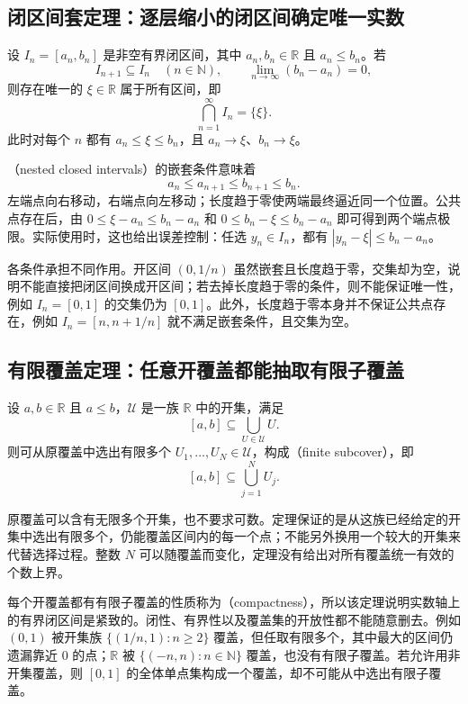 \documentclass[UTF8,12pt,a4paper,fontset=fandol,oneside]{ctexart}
\begin{document}
\subsection{闭区间套定理：逐层缩小的闭区间确定唯一实数}

\begin{theorem}[闭区间套定理]
  \label{thm:nested-intervals}
  设 $I_n=[a_n,b_n]$ 是非空有界闭区间，其中 $a_n,b_n\in\mathbb R$ 且 $a_n\leq b_n$。若
  \[
    I_{n+1}\subseteq I_n\quad(n\in\mathbb N),
    \qquad \lim_{n\to\infty}(b_n-a_n)=0,
  \]
  则存在唯一的 $\xi\in\mathbb R$ 属于所有区间，即
  \[
    \bigcap_{n=1}^{\infty}I_n=\{\xi\}.
  \]
  此时对每个 $n$ 都有 $a_n\leq\xi\leq b_n$，且 $a_n\to\xi$、$b_n\to\xi$。
\end{theorem}

（nested closed intervals）的嵌套条件意味着
\[
  a_n\leq a_{n+1}\leq b_{n+1}\leq b_n.
\]
左端点向右移动，右端点向左移动；长度趋于零使两端最终逼近同一个位置。公共点存在后，由 $0\leq\xi-a_n\leq b_n-a_n$ 和 $0\leq b_n-\xi\leq b_n-a_n$ 即可得到两个端点极限。实际使用时，这也给出误差控制：任选 $y_n\in I_n$，都有 $|y_n-\xi|\leq b_n-a_n$。

各条件承担不同作用。开区间 $(0,1/n)$ 虽然嵌套且长度趋于零，交集却为空，说明不能直接把闭区间换成开区间；若去掉长度趋于零的条件，则不能保证唯一性，例如 $I_n=[0,1]$ 的交集仍为 $[0,1]$。此外，长度趋于零本身并不保证公共点存在，例如 $I_n=[n,n+1/n]$ 就不满足嵌套条件，且交集为空。

\subsection{有限覆盖定理：任意开覆盖都能抽取有限子覆盖}

\begin{theorem}[有限覆盖定理]
  \label{thm:finite-cover}
  设 $a,b\in\mathbb R$ 且 $a\leq b$，$\mathcal U$ 是一族 $\mathbb R$ 中的开集，满足
  \[
    [a,b]\subseteq\bigcup_{U\in\mathcal U}U.
  \]
  则可从原覆盖中选出有限多个 $U_1,\ldots,U_N\in\mathcal U$，构成（finite subcover），即
  \[
    [a,b]\subseteq\bigcup_{j=1}^{N}U_j.
  \]
\end{theorem}

原覆盖可以含有无限多个开集，也不要求可数。定理保证的是从这族已经给定的开集中选出有限多个，仍能覆盖区间内的每一个点；不能另外换用一个较大的开集来代替选择过程。整数 $N$ 可以随覆盖而变化，定理没有给出对所有覆盖统一有效的个数上界。

每个开覆盖都有有限子覆盖的性质称为（compactness），所以该定理说明实数轴上的有界闭区间是紧致的。闭性、有界性以及覆盖集的开放性都不能随意删去。例如 $(0,1)$ 被开集族 $\{(1/n,1):n\geq2\}$ 覆盖，但任取有限多个，其中最大的区间仍遗漏靠近 $0$ 的点；$\mathbb R$ 被 $\{(-n,n):n\in\mathbb N\}$ 覆盖，也没有有限子覆盖。若允许用非开集覆盖，则 $[0,1]$ 的全体单点集构成一个覆盖，却不可能从中选出有限子覆盖。
\end{document}
